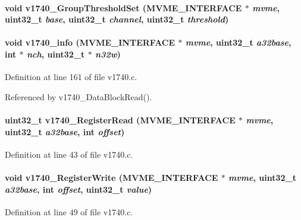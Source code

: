 \paragraph[{v1740\_\-GroupThresholdSet}]{\setlength{\rightskip}{0pt plus 5cm}void v1740\_\-GroupThresholdSet ({\bf MVME\_\-INTERFACE} $\ast$ {\em mvme}, \/  uint32\_\-t {\em base}, \/  uint32\_\-t {\em channel}, \/  uint32\_\-t {\em threshold})}\hfill\label{v1740drv_8h_ad0871283c1dbefac475a840cf1fce79c}
\paragraph[{v1740\_\-info}]{\setlength{\rightskip}{0pt plus 5cm}void v1740\_\-info ({\bf MVME\_\-INTERFACE} $\ast$ {\em mvme}, \/  uint32\_\-t {\em a32base}, \/  int $\ast$ {\em nch}, \/  uint32\_\-t $\ast$ {\em n32w})}\hfill\label{v1740drv_8h_a8f83806dffbf00db238e1049f825050d}


Definition at line 161 of file v1740.c.

Referenced by v1740\_\-DataBlockRead().
\paragraph[{v1740\_\-RegisterRead}]{\setlength{\rightskip}{0pt plus 5cm}uint32\_\-t v1740\_\-RegisterRead ({\bf MVME\_\-INTERFACE} $\ast$ {\em mvme}, \/  uint32\_\-t {\em a32base}, \/  int {\em offset})}\hfill\label{v1740drv_8h_a1b36b0118dab8df824d20ec8c7fb53a2}


Definition at line 43 of file v1740.c.
\paragraph[{v1740\_\-RegisterWrite}]{\setlength{\rightskip}{0pt plus 5cm}void v1740\_\-RegisterWrite ({\bf MVME\_\-INTERFACE} $\ast$ {\em mvme}, \/  uint32\_\-t {\em a32base}, \/  int {\em offset}, \/  uint32\_\-t {\em value})}\hfill\label{v1740drv_8h_a614a54fec1372f260060e8b0f4f6cf5c}


Definition at line 49 of file v1740.c.
